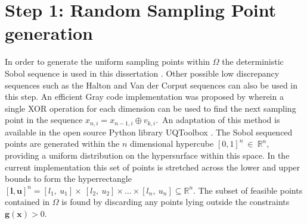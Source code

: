 \section{Step 1: Random Sampling Point generation} \label{sec:tgo1}
In order to generate the uniform sampling points within $\Omega$ the deterministic Sobol sequence is used in this dissertation \citep{Henderson2015, Sobol1967}. Other possible low discrepancy sequences such as the Halton and Van der Corput sequences \citep{zbMATH03440485} can also be used in this step. An efficient Gray code implementation was proposed by \citet{Antonov1979} wherein a single XOR operation for each dimension can be used to find the next sampling point in the sequence $x_{n,i}=x_{n-1,i} \oplus v_{k,i}. \,$ An adaptation of this method is available in the open source Python library UQToolbox \citep{Bigoni2016}. The Sobol sequenced points are generated within the $n$ dimensional hypercube $ [0, 1]^n~\in ~\mathbb{R}^n $, providing a uniform distribution on the hypersurface within this space. In the current implementation this set of points is stretched across the lower and upper bounds to form the hyperrectangle $[\mathbf{l}, \mathbf{u}]^n = [l_1,~u_1] \times~[l_2,~u_2]  \times \dots \times [l_n,~u_n] \subseteq  \mathbb{R}^n$. The subset of feasible points contained in $\Omega$ is found by discarding any points lying outside the constraints $ \mathbf{g}(\mathbf{x}) > 0$.

